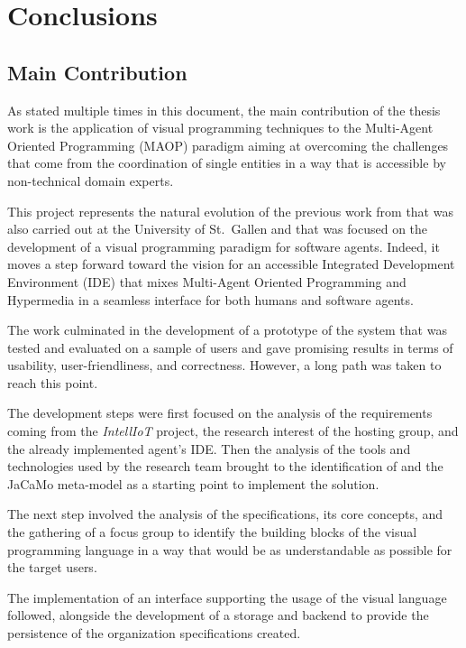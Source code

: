 \chapter*{Conclusions}

\section*{Main Contribution}
As stated multiple times in this document, the main contribution of the thesis work is the application of visual programming techniques to the Multi-Agent Oriented Programming (MAOP) paradigm aiming at overcoming the challenges that come from the coordination of single entities in a way that is accessible by non-technical domain experts.

This project represents the natural evolution of the previous work from \cite{burattini2022agent} that was also carried out at the University of St.\ Gallen and that was focused on the development of a visual programming paradigm for software agents.
Indeed, it moves a step forward toward the vision for an accessible Integrated Development Environment (IDE) that mixes Multi-Agent Oriented Programming and Hypermedia in a seamless interface for both humans and software agents.

The work culminated in the development of a prototype of the system that was tested and evaluated on a sample of users and gave promising results in terms of usability, user-friendliness, and correctness.
However, a long path was taken to reach this point.

The development steps were first focused on the analysis of the requirements coming from the \textit{IntellIoT} project, the research interest of the hosting group, and the already implemented agent's IDE.
Then the analysis of the tools and technologies used by the research team brought to the identification of \moise{} and the JaCaMo meta-model as a starting point to implement the solution.

The next step involved the analysis of the \moise{} specifications, its core concepts, and the gathering of a focus group to identify the building blocks of the visual programming language in a way that would be as understandable as possible for the target users.

The implementation of an interface supporting the usage of the visual language followed, alongside the development of a storage and backend to provide the persistence of the organization specifications created.

